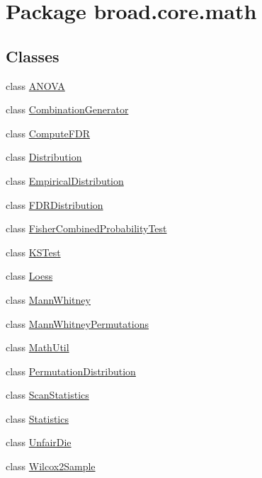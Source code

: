 \hypertarget{namespacebroad_1_1core_1_1math}{\section{Package broad.\+core.\+math}
\label{namespacebroad_1_1core_1_1math}
}
\subsection*{Classes}
\begin{DoxyCompactItemize}
\item 
class \hyperlink{classbroad_1_1core_1_1math_1_1_a_n_o_v_a}{A\+N\+O\+V\+A}
\item 
class \hyperlink{classbroad_1_1core_1_1math_1_1_combination_generator}{Combination\+Generator}
\item 
class \hyperlink{classbroad_1_1core_1_1math_1_1_compute_f_d_r}{Compute\+F\+D\+R}
\item 
class \hyperlink{classbroad_1_1core_1_1math_1_1_distribution}{Distribution}
\item 
class \hyperlink{classbroad_1_1core_1_1math_1_1_empirical_distribution}{Empirical\+Distribution}
\item 
class \hyperlink{classbroad_1_1core_1_1math_1_1_f_d_r_distribution}{F\+D\+R\+Distribution}
\item 
class \hyperlink{classbroad_1_1core_1_1math_1_1_fisher_combined_probability_test}{Fisher\+Combined\+Probability\+Test}
\item 
class \hyperlink{classbroad_1_1core_1_1math_1_1_k_s_test}{K\+S\+Test}
\item 
class \hyperlink{classbroad_1_1core_1_1math_1_1_loess}{Loess}
\item 
class \hyperlink{classbroad_1_1core_1_1math_1_1_mann_whitney}{Mann\+Whitney}
\item 
class \hyperlink{classbroad_1_1core_1_1math_1_1_mann_whitney_permutations}{Mann\+Whitney\+Permutations}
\item 
class \hyperlink{classbroad_1_1core_1_1math_1_1_math_util}{Math\+Util}
\item 
class \hyperlink{classbroad_1_1core_1_1math_1_1_permutation_distribution}{Permutation\+Distribution}
\item 
class \hyperlink{classbroad_1_1core_1_1math_1_1_scan_statistics}{Scan\+Statistics}
\item 
class \hyperlink{classbroad_1_1core_1_1math_1_1_statistics}{Statistics}
\item 
class \hyperlink{classbroad_1_1core_1_1math_1_1_unfair_die}{Unfair\+Die}
\item 
class \hyperlink{classbroad_1_1core_1_1math_1_1_wilcox2_sample}{Wilcox2\+Sample}
\end{DoxyCompactItemize}

